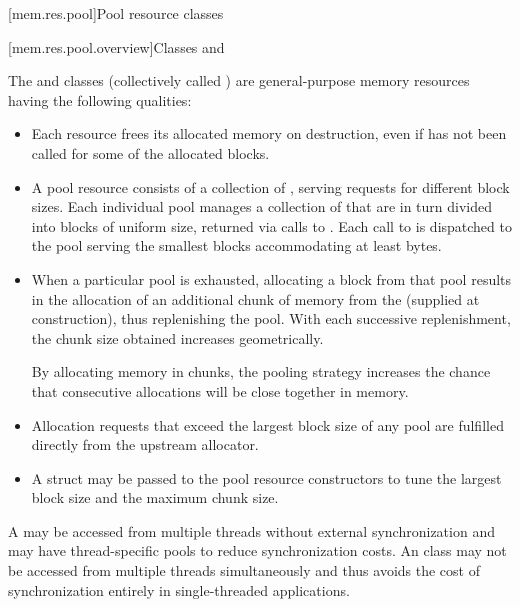 [mem.res.pool]{Pool resource classes}

[mem.res.pool.overview]{Classes  and }

\pnum
The  and
 classes
(collectively called )
are general-purpose memory resources having the following qualities:
\begin{itemize}
\item
Each resource frees its allocated memory on destruction,
even if  has not been called for some of the allocated blocks.
\item
A pool resource consists of a collection of ,
serving requests for different block sizes.
Each individual pool manages a collection of 
that are in turn divided into blocks of uniform size,
returned via calls to .
Each call to  is dispatched
to the pool serving the smallest blocks accommodating at least  bytes.
\item
When a particular pool is exhausted,
allocating a block from that pool results in the allocation
of an additional chunk of memory from the 
(supplied at construction), thus replenishing the pool.
With each successive replenishment,
the chunk size obtained increases geometrically.
\begin{note}
By allocating memory in chunks,
the pooling strategy increases the chance that consecutive allocations
will be close together in memory.
\end{note}
\item
Allocation requests that exceed the largest block size of any pool
are fulfilled directly from the upstream allocator.
\item
A  struct may be passed to the pool resource constructors
to tune the largest block size and the maximum chunk size.
\end{itemize}

\pnum
A  may be accessed from multiple threads
without external synchronization
and may have thread-specific pools to reduce synchronization costs.
An  class may not be accessed
from multiple threads simultaneously
and thus avoids the cost of synchronization entirely
in single-threaded applications.

